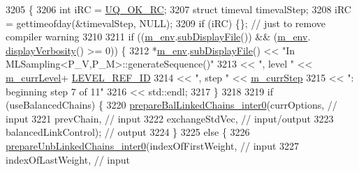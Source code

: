 \begin{DoxyCode}
3205 \{
3206   \textcolor{keywordtype}{int} iRC = \hyperlink{namespace_q_u_e_s_o_a8e909502900aecf24cedba022ea84471}{UQ\_OK\_RC};
3207   \textcolor{keyword}{struct }timeval timevalStep;
3208   iRC = gettimeofday(&timevalStep, NULL);
3209   \textcolor{keywordflow}{if} (iRC) \{\}; \textcolor{comment}{// just to remove compiler warning}
3210 
3211       \textcolor{keywordflow}{if} ((\hyperlink{class_q_u_e_s_o_1_1_m_l_sampling_a13f1ca4fe9f94822fe572a743eaced1d}{m\_env}.\hyperlink{class_q_u_e_s_o_1_1_base_environment_a8a0064746ae8dddfece4229b9ad374d6}{subDisplayFile}()) && (\hyperlink{class_q_u_e_s_o_1_1_m_l_sampling_a13f1ca4fe9f94822fe572a743eaced1d}{m\_env}.
      \hyperlink{class_q_u_e_s_o_1_1_base_environment_a1fe5f244fc0316a0ab3e37463f108b96}{displayVerbosity}() >= 0)) \{
3212         *\hyperlink{class_q_u_e_s_o_1_1_m_l_sampling_a13f1ca4fe9f94822fe572a743eaced1d}{m\_env}.\hyperlink{class_q_u_e_s_o_1_1_base_environment_a8a0064746ae8dddfece4229b9ad374d6}{subDisplayFile}() << \textcolor{stringliteral}{"In MLSampling<P\_V,P\_M>::generateSequence()"}
3213                                 << \textcolor{stringliteral}{", level "} << \hyperlink{class_q_u_e_s_o_1_1_m_l_sampling_af9416874c856e50f3b35270e801f17e4}{m\_currLevel}+
      \hyperlink{_m_l_sampling_level_options_8h_a68d15eaf394d210effcf584b938206d3}{LEVEL\_REF\_ID}
3214                                 << \textcolor{stringliteral}{", step "}  << \hyperlink{class_q_u_e_s_o_1_1_m_l_sampling_a1b1f8ccb4823bdfa26ec652f0807c63e}{m\_currStep}
3215                                 << \textcolor{stringliteral}{": beginning step 7 of 11"}
3216                                 << std::endl;
3217       \}
3218 
3219       \textcolor{keywordflow}{if} (useBalancedChains) \{
3220         \hyperlink{class_q_u_e_s_o_1_1_m_l_sampling_a75b2d73a0b07f594951a89cc1bc96849}{prepareBalLinkedChains\_inter0}(currOptions,                     \textcolor{comment}{//
       input}
3221                                       prevChain,                       \textcolor{comment}{// input}
3222                                       exchangeStdVec,                  \textcolor{comment}{// input/output}
3223                                       balancedLinkControl);            \textcolor{comment}{// output}
3224       \}
3225       \textcolor{keywordflow}{else} \{
3226         \hyperlink{class_q_u_e_s_o_1_1_m_l_sampling_a37dcf4d893b6c8f67fe077892bada773}{prepareUnbLinkedChains\_inter0}(indexOfFirstWeight,              \textcolor{comment}{//
       input}
3227                                       indexOfLastWeight,               \textcolor{comment}{// input}

\end{DoxyCode}

